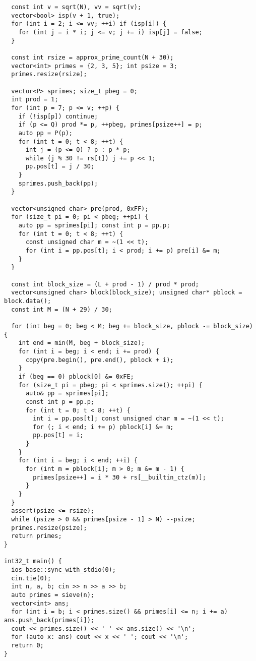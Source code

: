 \documentclass[10pt,a4paper,onesided]{article}
\begin{document}
\begin{multicols*}{3}
\begin{lstlisting}
  const int v = sqrt(N), vv = sqrt(v);
  vector<bool> isp(v + 1, true);
  for (int i = 2; i <= vv; ++i) if (isp[i]) {
    for (int j = i * i; j <= v; j += i) isp[j] = false;
  }

  const int rsize = approx_prime_count(N + 30);
  vector<int> primes = {2, 3, 5}; int psize = 3;
  primes.resize(rsize);

  vector<P> sprimes; size_t pbeg = 0;
  int prod = 1; 
  for (int p = 7; p <= v; ++p) {
    if (!isp[p]) continue;
    if (p <= Q) prod *= p, ++pbeg, primes[psize++] = p;
    auto pp = P(p); 
    for (int t = 0; t < 8; ++t) {
      int j = (p <= Q) ? p : p * p;
      while (j % 30 != rs[t]) j += p << 1;
      pp.pos[t] = j / 30;
    }
    sprimes.push_back(pp);
  }

  vector<unsigned char> pre(prod, 0xFF);
  for (size_t pi = 0; pi < pbeg; ++pi) {
    auto pp = sprimes[pi]; const int p = pp.p;
    for (int t = 0; t < 8; ++t) {
      const unsigned char m = ~(1 << t);
      for (int i = pp.pos[t]; i < prod; i += p) pre[i] &= m;
    }
  }

  const int block_size = (L + prod - 1) / prod * prod;
  vector<unsigned char> block(block_size); unsigned char* pblock = block.data();
  const int M = (N + 29) / 30;

  for (int beg = 0; beg < M; beg += block_size, pblock -= block_size) {
    int end = min(M, beg + block_size);
    for (int i = beg; i < end; i += prod) {
      copy(pre.begin(), pre.end(), pblock + i);
    }
    if (beg == 0) pblock[0] &= 0xFE;
    for (size_t pi = pbeg; pi < sprimes.size(); ++pi) {
      auto& pp = sprimes[pi];
      const int p = pp.p;
      for (int t = 0; t < 8; ++t) {
        int i = pp.pos[t]; const unsigned char m = ~(1 << t);
        for (; i < end; i += p) pblock[i] &= m;
        pp.pos[t] = i;
      }
    }
    for (int i = beg; i < end; ++i) {
      for (int m = pblock[i]; m > 0; m &= m - 1) {
        primes[psize++] = i * 30 + rs[__builtin_ctz(m)];
      }
    }
  }
  assert(psize <= rsize);
  while (psize > 0 && primes[psize - 1] > N) --psize;
  primes.resize(psize);
  return primes;
}

int32_t main() {
  ios_base::sync_with_stdio(0);
  cin.tie(0);
  int n, a, b; cin >> n >> a >> b;
  auto primes = sieve(n);
  vector<int> ans;
  for (int i = b; i < primes.size() && primes[i] <= n; i += a) ans.push_back(primes[i]);
  cout << primes.size() << ' ' << ans.size() << '\n';
  for (auto x: ans) cout << x << ' '; cout << '\n';
  return 0;
}
\end{lstlisting}

\end{multicols*}
\end{document}
